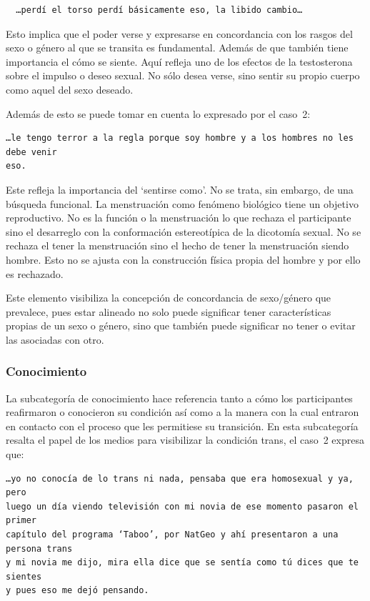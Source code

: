 \begin{verbatim}
  …perdí el torso perdí básicamente eso, la libido cambio…
\end{verbatim}

Esto implica que el poder verse y expresarse en concordancia con los rasgos del
sexo o género al que se transita es fundamental. Además de que también tiene
importancia el cómo se siente. Aquí refleja uno de los efectos de la
testosterona sobre el impulso o deseo sexual. No sólo desea verse, sino sentir
su propio cuerpo como aquel del sexo deseado.

Además de esto se puede tomar en cuenta lo expresado por el caso~2:

\begin{verbatim}
…le tengo terror a la regla porque soy hombre y a los hombres no les debe venir
eso.
\end{verbatim}

Este refleja la importancia del ‘sentirse como’. No se trata, sin embargo, de
una búsqueda funcional. La menstruación como fenómeno biológico tiene un
objetivo reproductivo. No es la función o la menstruación lo que rechaza el
participante sino el desarreglo con la conformación estereotípica de la
dicotomía sexual. No se rechaza el tener la menstruación sino el hecho de tener
la menstruación siendo hombre. Esto no se ajusta con la construcción física
propia del hombre y por ello es rechazado.

Este elemento visibiliza la concepción de concordancia de sexo/género que
prevalece, pues estar alineado no solo puede significar tener características
propias de un sexo o género, sino que también puede significar no tener o evitar
las asociadas con otro.

\subsubsection{Conocimiento}

La subcategoría de conocimiento hace referencia tanto a cómo los participantes
reafirmaron o conocieron su condición así como a la manera con la cual entraron
en contacto con el proceso que les permitiese su transición. En esta
subcategoría resalta el papel de los medios para visibilizar la
condición trans, el caso~2 expresa que:

\begin{verbatim}
…yo no conocía de lo trans ni nada, pensaba que era homosexual y ya, pero
luego un día viendo televisión con mi novia de ese momento pasaron el primer
capítulo del programa ‘Taboo’, por NatGeo y ahí presentaron a una persona trans
y mi novia me dijo, mira ella dice que se sentía como tú dices que te sientes
y pues eso me dejó pensando.
\end{verbatim}

